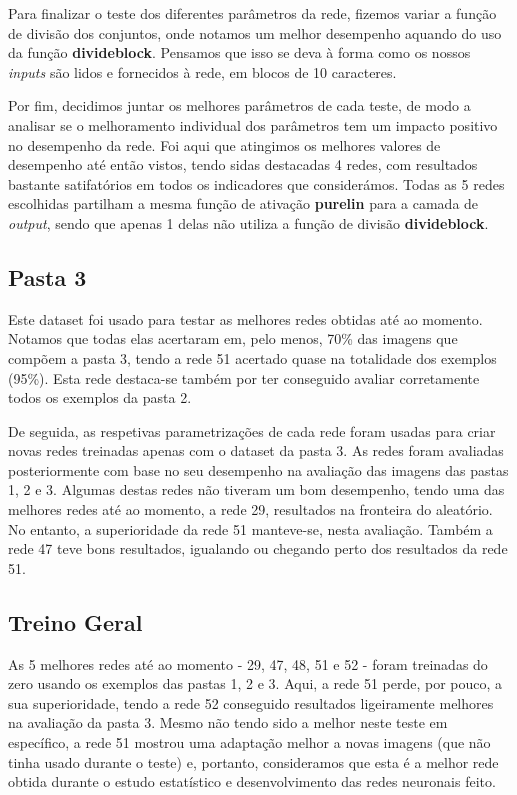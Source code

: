 \documentclass[11pt]{article}
\begin{document}
	Para finalizar o teste dos diferentes parâmetros da rede, fizemos variar a função de divisão dos conjuntos, onde notamos um melhor desempenho aquando do uso da função \textbf{divideblock}. Pensamos que isso se deva à forma como os nossos \textit{inputs} são lidos e fornecidos à rede, em blocos de 10 caracteres.
	
	Por fim, decidimos juntar os melhores parâmetros de cada teste, de modo a analisar se o melhoramento individual dos parâmetros tem um impacto positivo no desempenho da rede. Foi aqui que atingimos os melhores valores de desempenho até então vistos, tendo sidas destacadas 4 redes, com resultados bastante satifatórios em todos os indicadores que considerámos. Todas as 5 redes escolhidas partilham a mesma função de ativação \textbf{purelin} para a camada de \textit{output}, sendo que apenas 1 delas não utiliza a função de divisão \textbf{divideblock}.

	
	\large
	\subsection{Pasta 3}
	\normalsize
	
	Este dataset foi usado para testar as melhores redes obtidas até ao momento. Notamos que todas elas acertaram em, pelo menos, 70\% das imagens que compõem a pasta 3, tendo a rede 51 acertado quase na totalidade dos exemplos (95\%). Esta rede destaca-se também por ter conseguido avaliar corretamente todos os exemplos da pasta 2.
	
	De seguida, as respetivas parametrizações de cada rede foram usadas para criar novas redes treinadas apenas com o dataset da pasta 3. As redes foram avaliadas posteriormente com base no seu desempenho na avaliação das imagens das pastas 1, 2 e 3. Algumas destas redes não tiveram um bom desempenho, tendo uma das melhores redes até ao momento, a rede 29, resultados na fronteira do aleatório. No entanto, a superioridade da rede 51 manteve-se, nesta avaliação. Também a rede 47 teve bons resultados, igualando ou chegando perto dos resultados da rede 51.
	
	\large
	\subsection{Treino Geral}
	\normalsize
	
	As 5 melhores redes até ao momento - 29, 47, 48, 51 e 52 - foram treinadas do zero usando os exemplos das pastas 1, 2 e 3. Aqui, a rede 51 perde, por pouco, a sua superioridade, tendo a rede 52 conseguido resultados ligeiramente melhores na avaliação da pasta 3. Mesmo não tendo sido a melhor neste teste em específico, a rede 51 mostrou uma adaptação melhor a novas imagens (que não tinha usado durante o teste) e, portanto, consideramos que esta é a melhor rede obtida durante o estudo estatístico e desenvolvimento das redes neuronais feito. 
	
\end{document}
